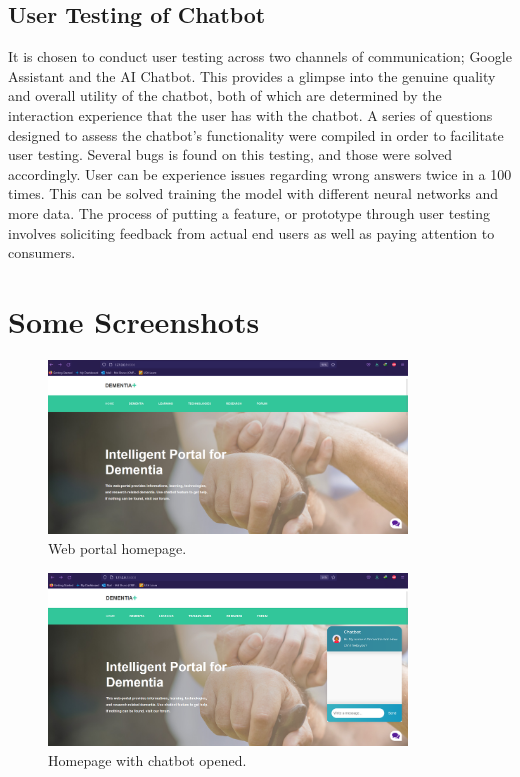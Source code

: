 \subsection{User Testing of Chatbot}
It is chosen to conduct user testing across two channels of communication; Google Assistant and the AI Chatbot. This provides a glimpse into the genuine quality and overall utility of the chatbot, both of which are determined by the interaction experience that the user has with the chatbot. A series of questions designed to assess the chatbot's functionality were compiled in order to facilitate user testing. Several bugs is found on this testing, and those were solved accordingly. User can be experience issues regarding wrong answers twice in a 100 times. This can be solved training the model with different neural networks and more data. The process of putting a feature, or prototype through user testing involves soliciting feedback from actual end users as well as paying attention to consumers.

\goodbreak
\goodbreak
\section{Some Screenshots}

\begin{figure}[!h]
	\centering
	\includegraphics[width=0.85\textwidth]{homepage}
	\caption{Web portal homepage.}
	\label{fig:11}
\end{figure}

\begin{figure}[!h]
	\centering
	\includegraphics[width=0.85\textwidth]{home1}
	\caption{Homepage with chatbot opened.}
	\label{fig:12}
\end{figure}

